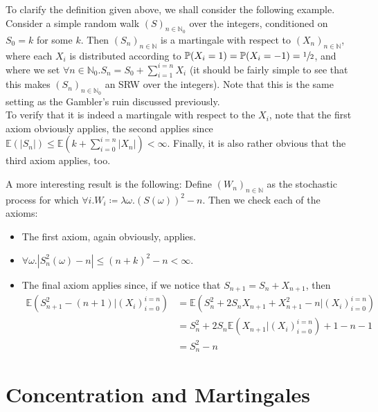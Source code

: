 	To clarify the definition given above, we shall consider the following example. Consider 
	a simple random walk $(S)_{n \in \mathbb{N}_0}$ over the integers, conditioned
	on $S_0 = k$ for some $k$. Then $(S_n)_{n\in \mathbb{N}}$ is a martingale with respect to 
	$(X_n)_{n \in \mathbb{N}}$, where each $X_i$ is distributed according to $\mathbb{P}(X_i=1)
	=\mathbb{P}(X_i=-1)=\sfrac{1}{2}$, and where we set $\forall n \in \mathbb{N}_0 . S_n = S_0 
	+ \sum_{i=1}^{i=n} X_i$ (it should be fairly simple to see that this makes $(S_n)_{n\in
	\mathbb{N}_0}$ an SRW over the integers). Note that this is the same setting as the 
	Gambler's ruin discussed previously. 
	\\
	To verify that it is indeed a martingale with respect to the $X_i$, note that the first 
	axiom obviously applies, the second applies since $\mathbb{E}(|S_n|) \leq \mathbb{E}\left(k+
	\sum_{i=0}^{i=n} |X_n|\right)< \infty$. Finally, it is also rather obvious that the third 
	axiom applies, too.\par 

	A more interesting result is the following: Define $(W_n)_{n \in \mathbb{N}}$ as the 
	stochastic process for which $\forall i . W_i \coloneqq \lambda \omega . (S(\omega))^2-n$.
	Then we check each of the axioms:
	\begin{itemize}
		\item The first axiom, again obviously, applies.
		\item $\forall \omega . |S_n^2(\omega) - n| \leq (n+k)^2 - n < \infty$.
		\item The final axiom applies since, if we notice that $S_{n+1}= S_n +X_{n+1}$, 
		then
		\begin{align*}
			\mathbb{E}(S_{n+1}^2-(n+1)|(X_i)_{i=0}^{i=n}) &= \mathbb{E}(S_n^2+2S_n
			X_{n+1}+X_{n+1}^2 - n|(X_i)_{i=0}^{i=n}) \\
			&= S_n^2 + 2S_n \mathbb{E}(X_{n+1}|(X_i)_{i=0}^{i=n}) + 1 - n -1 \\
			&= S_n^2 - n
		\end{align*}
	\end{itemize}

\section{Concentration and Martingales}
